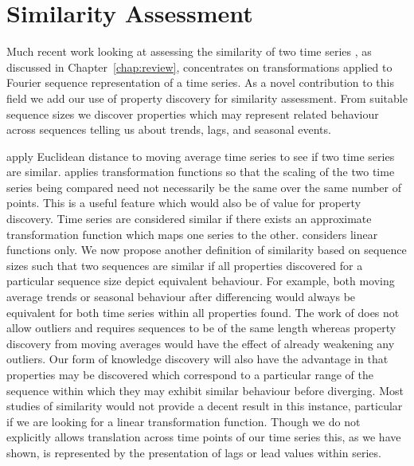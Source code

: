 \section{Similarity Assessment}\label{sec:tr_sim_ass}

Much recent work looking at assessing the similarity of two time
series \cite{alss95,frm94,dgm97,rm97}, as discussed in
Chapter~\ref{chap:review}, concentrates on transformations applied to
Fourier sequence representation of a time series.  As a novel
contribution to this field we add our use of property discovery for
similarity assessment. From suitable sequence sizes we
discover properties which may represent related behaviour across
sequences telling us about trends, lags, and seasonal events.

\medskip

\cite{rm97} apply Euclidean distance
to moving average time series to see if two time series are similar. 
\cite{dgm97} applies transformation functions so that the scaling of
the two time series being compared need not necessarily be the same
over the same number of points. This is a useful feature which would
also be of value for property discovery. Time series are considered
similar if there exists an approximate transformation function which maps one
series to the other. \cite{dgm97} considers linear functions only. We
now propose another definition of similarity based on sequence sizes
such that two sequences are similar if all properties discovered for a
particular sequence size depict equivalent behaviour. For example,
both moving average trends or seasonal behaviour after differencing
would always be equivalent for both time series within all properties
found. The work of \cite{alss95} does not allow outliers and requires
sequences to be of the same length whereas
property discovery from moving averages would have the effect of
already weakening any outliers. Our form of knowledge discovery will
also have the advantage in that properties may be discovered which
correspond to a particular range of the sequence within which they may
exhibit similar behaviour before diverging.
Most studies of similarity
would not provide a decent result in this instance, particular if we
are looking for a linear transformation function.  Though we do not
explicitly allows translation across time points of our time series
this, as we have shown, is represented by the presentation of lags or
lead values within series. 

\medskip

